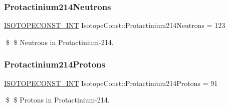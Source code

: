 \subsubsection{\texorpdfstring{Protactinium214\+Neutrons}{Protactinium214Neutrons}}
{\footnotesize\ttfamily \mbox{\hyperlink{group___isotope_const-_macros_ga5f18360b3e99483a35c32d789e62621c}{I\+S\+O\+T\+O\+P\+E\+C\+O\+N\+S\+T\+\_\+\+I\+NT}} Isotope\+Const\+::\+Protactinium214\+Neutrons = 123}

\$ \$ Neutrons in Protactinium-\/214. \mbox{\label{group___isotope_const-_protactinium-_pa214_ga96f2633872d10b87d6f8537b4f7dcf81}} 
\subsubsection{\texorpdfstring{Protactinium214\+Protons}{Protactinium214Protons}}
{\footnotesize\ttfamily \mbox{\hyperlink{group___isotope_const-_macros_ga5f18360b3e99483a35c32d789e62621c}{I\+S\+O\+T\+O\+P\+E\+C\+O\+N\+S\+T\+\_\+\+I\+NT}} Isotope\+Const\+::\+Protactinium214\+Protons = 91}

\$ \$ Protons in Protactinium-\/214. 